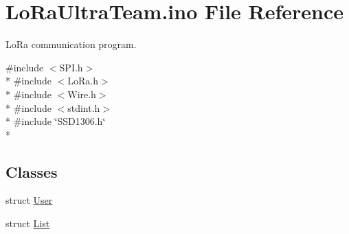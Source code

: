 \hypertarget{_lo_ra_ultra_team_8ino}{}\section{Lo\+Ra\+Ultra\+Team.\+ino File Reference}
\label{_lo_ra_ultra_team_8ino}


Lo\+Ra communication program.  


{\ttfamily \#include $<$S\+P\+I.\+h$>$}\\*
{\ttfamily \#include $<$Lo\+Ra.\+h$>$}\\*
{\ttfamily \#include $<$Wire.\+h$>$}\\*
{\ttfamily \#include $<$stdint.\+h$>$}\\*
{\ttfamily \#include \char`\"{}S\+S\+D1306.\+h\char`\"{}}\\*
\subsection*{Classes}
\begin{DoxyCompactItemize}
\item 
struct \hyperlink{struct_user}{User}
\item 
struct \hyperlink{struct_list}{List}
\end{DoxyCompactItemize}
